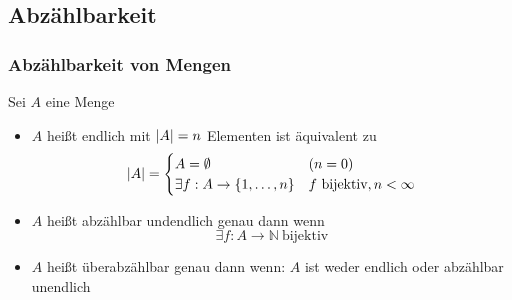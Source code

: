 \documentclass[11pt]{article}
\DeclarePairedDelimiter\abs{\lvert}{\rvert}%
\begin{document}
\subsection{Abzählbarkeit}
\label{sec-2-5}
\subsubsection{Abzählbarkeit von Mengen}
\label{sec-2-5-1}
Sei $A$ eine Menge\\
\begin{itemize}
\item $A$ heißt endlich mit $\abs{A} = n$ Elementen ist äquivalent zu
\[\abs{A} = \begin{cases} A = \emptyset &(n = 0) \\ \exists f:A\to \{1,\ldots,n\} &f~\text{bijektiv},n < \infty\end{cases}\]
\item $A$ heißt abzählbar undendlich genau dann wenn \[\exists f: A\to \mathbb{N}~\text{bijektiv}\]
\item $A$ heißt überabzählbar genau dann wenn: $A$ ist weder endlich oder abzählbar unendlich
\end{itemize}
\end{document}
